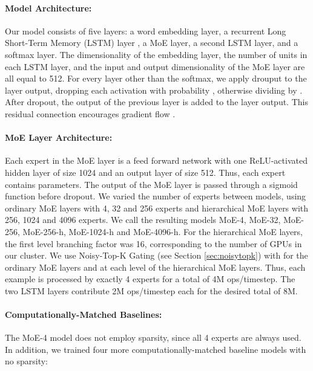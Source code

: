 \documentclass{article} \pdfoutput=1
\begin{document}
\paragraph{Model Architecture:}  Our model consists of five layers: a word embedding layer, a recurrent Long Short-Term Memory (LSTM) layer \citep{Hochreiter:1997:LSM,Gers:2000:LFC}, a MoE layer, a second LSTM layer, and a softmax layer.  The dimensionality of the embedding layer, the number of units in each LSTM layer, and the input and output dimensionality of the MoE layer are all equal to 512.  For every layer other than the softmax, we apply drouput \citep{ZarembaSV14} to the layer output, dropping each activation with probability , otherwise dividing by .  After dropout, the output of the previous layer is added to the layer output. This residual connection encourages gradient flow \citep{HeZRS:2015:DRL}.

\paragraph{MoE Layer Architecture:}  Each expert in the MoE layer is a feed forward network with one ReLU-activated hidden layer of size 1024 and an output layer of size 512.  Thus, each expert contains  parameters.  The output of the MoE layer is passed through a sigmoid function before dropout.  We varied the number of experts between models, using ordinary MoE layers with 4, 32 and 256 experts and hierarchical MoE layers with 256, 1024 and 4096 experts.   We call the resulting models MoE-4, MoE-32, MoE-256, MoE-256-h, MoE-1024-h and MoE-4096-h.  For the hierarchical MoE layers, the first level branching factor was 16, corresponding to the number of GPUs in our cluster.  We use Noisy-Top-K Gating (see Section \ref{sec:noisytopk}) with  for the ordinary MoE layers and  at each level of the hierarchical MoE layers.  Thus, each example is processed by exactly 4 experts for a total of 4M ops/timestep.  The two LSTM layers contribute 2M ops/timestep each for the desired total of 8M.

\paragraph{Computationally-Matched Baselines:}

 
The MoE-4 model does not employ sparsity, since all 4 experts are always used.  In addition, we trained four more computationally-matched baseline models with no sparsity:
\end{document}

